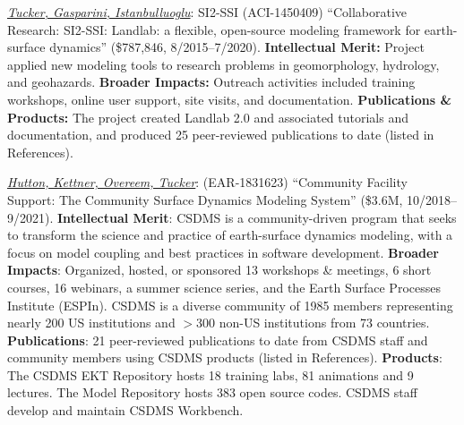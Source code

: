 \noindent
\emph{\underline{Tucker, Gasparini, Istanbulluoglu}}: SI2-SSI (ACI-1450409) ``Collaborative Research: SI2-SSI: Landlab: a flexible, open-source modeling framework for earth-surface dynamics'' (\$787,846, 8/2015--7/2020).
\textbf{Intellectual Merit:} Project applied new modeling tools to research problems in geomorphology, hydrology, and geohazards. \textbf{Broader Impacts:} Outreach activities included training workshops, online user support, site visits, and documentation. \textbf{Publications \& Products:} The project created Landlab 2.0 and associated tutorials and documentation, and produced 25 peer-reviewed publications to date (listed in References).

\noindent
\emph{\underline{Hutton, Kettner, Overeem, Tucker}}: (EAR-1831623) ``Community Facility Support: The Community Surface Dynamics Modeling System'' (\$3.6M, 10/2018--9/2021).
\textbf{Intellectual Merit}: CSDMS is a community-driven program that seeks to transform the science and practice of  earth-surface dynamics modeling, with a focus on model coupling and  best practices in software development.
\textbf{Broader Impacts}:  Organized, hosted, or sponsored 13 workshops \& meetings, 6 short courses, 16 webinars, a summer science series, and the Earth Surface Processes Institute (ESPIn). CSDMS is a diverse community of 1985 members representing nearly 200 US institutions and $>$300 non-US institutions from 73 countries.
\textbf{Publications}: 21 peer-reviewed publications to date from CSDMS staff and community members using CSDMS products (listed in References).
\textbf{Products}: The CSDMS EKT Repository hosts 18 training labs, 81 animations and 9 lectures. The Model Repository hosts 383 open source codes. CSDMS staff develop and maintain  CSDMS Workbench. %

